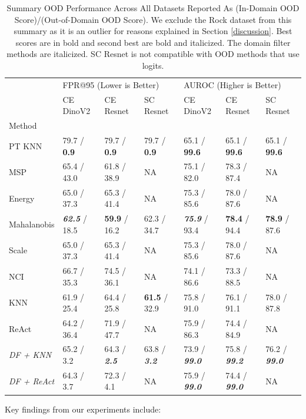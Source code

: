 \documentclass[11pt, oneside]{book}
\theoremstyle{plain}
\theoremstyle{definition}
\theoremstyle{remark}
\begin{document}
\begin{table}[h]
\centering
\caption{Summary OOD Performance Across All Datasets Reported As (In-Domain OOD Score)/(Out-of-Domain OOD Score). We exclude the Rock dataset from this summary as it is an outlier for reasons explained in Section \ref{discussion}. Best scores are in bold and second best are bold and italicized. The domain filter methods are italicized. SC Resnet is not compatible with OOD methods that use logits.}
\label{tab:domain_collapse_results}
\begin{tabular}{lllllll}
\toprule
 & \multicolumn{3}{l}{FPR@95 (Lower is Better)} & \multicolumn{3}{l}{AUROC (Higher is Better)} \\
 & CE DinoV2 & CE Resnet & SC Resnet & CE DinoV2 & CE Resnet & SC Resnet \\
Method &  &  &  &  &  &  \\
\midrule
PT KNN & 79.7 / \textbf{0.9} & 79.7 / \textbf{0.9}  & 79.7 / \textbf{0.9}  & 65.1 / \textbf{99.6} & 65.1 / \textbf{99.6} & 65.1 / \textbf{99.6} \\
MSP & 65.4 / 43.0 & 61.8 / 38.9 & NA & 75.1 / 82.0 & 78.3 / 87.4 & NA \\
Energy & 65.0 / 37.3 & 65.3 / 41.4 & NA & 75.3 / 85.6 & 78.0 / 87.6 & NA \\
Mahalanobis & \textbf{\textit{62.5}} / 18.5 & \textbf{59.9} / 16.2 & 62.3 / 34.7 & \textbf{\textit{75.9}} / 93.4 & \textbf{78.4} / 94.4 & \textbf{78.9} / 87.6 \\
Scale & 65.0 / 37.3 & 65.3 / 41.4 & NA & 75.3 / 85.6 & 78.0 / 87.6 & NA \\
NCI & 66.7 / 35.3 & 74.5 / 36.1 & NA & 74.1 / 86.6 & 73.3 / 88.5 & NA \\
KNN & 61.9 / 25.4 & 64.4 / 25.8 & \textbf{61.5} / 32.9 & 75.8 / 91.0 & 76.1 / 91.1 & 78.0 / 87.8 \\
ReAct & 64.2 / 36.4 & 71.9 / 47.7 & NA & 75.9 / 86.3 & 74.4 / 84.9 & NA \\
\textit{DF + KNN} & 65.2 / 3.2 & 64.3 / \textbf{\textit{2.5}} & 63.8 / \textbf{\textit{3.2}} & 73.9 / \textbf{\textit{99.0}} & 75.8 / \textbf{\textit{99.2}} & 76.2 / \textbf{\textit{99.0}} \\
\textit{DF + ReAct} & 64.3 / 3.7 & 72.3 / 4.1 & NA & 75.9 / \textbf{\textit{99.0}} & 74.4 / \textbf{\textit{99.0}} & NA \\
\bottomrule
\end{tabular}
\end{table}

Key findings from our experiments include:
\end{document}
